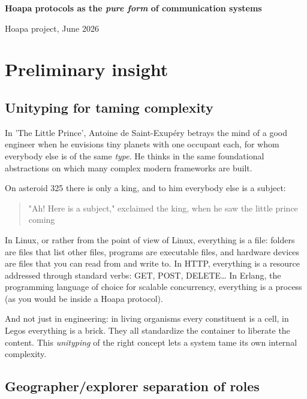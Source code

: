 \documentclass[11pt]{article}
\begin{document}
\begin{center}
{\LARGE\bfseries Hoapa protocols as the \emph{pure form} of communication systems\par}
\vspace{0.65em}
{\large Hoapa project, June 2026\par}
\end{center}
\vspace{0.75em}
\tableofcontents
\newpage

\section{Preliminary insight}

\subsection{Unityping for taming complexity}

In 'The Little Prince', Antoine de Saint-Exupéry betrays the mind of a good engineer when he envisions tiny planets with one occupant each, for whom everybody else is of the same \emph{type}. He thinks in the same foundational abstractions on which many complex modern frameworks are built.

On asteroid 325 there is only a king, and to him everybody else is a subject:

\begin{quote}
"Ah! Here is a subject," exclaimed the king, when he saw the little prince coming
\end{quote}

In Linux, or rather from the point of view of Linux, everything is a file: folders are files that list other files, programs are executable files, and hardware devices are files that you can read from and write to. In HTTP, everything is a resource addressed through standard verbs: GET, POST, DELETE\ldots{} In Erlang, the programming language of choice for scalable concurrency, everything is a process (as you would be inside a Hoapa protocol).

And not just in engineering: in living organisms every constituent is a cell, in Legos everything is a brick. They all standardize the container to liberate the content. This \emph{unityping} of the right concept lets a system tame its own internal complexity.

\subsection{Geographer/explorer separation of roles}
\end{document}
